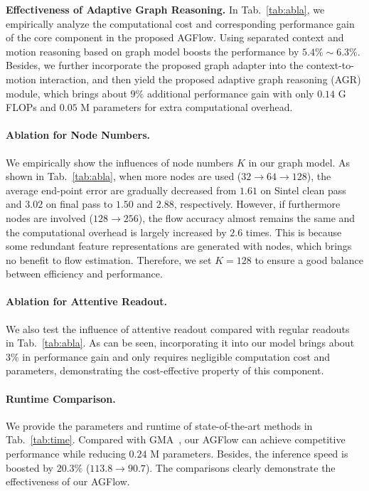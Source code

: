 \documentclass[letterpaper]{article} %
\begin{document}
\textbf{Effectiveness of Adaptive Graph Reasoning.} In Tab.~\ref{tab:abla}, we empirically analyze the computational cost and corresponding performance gain of the core component in the proposed AGFlow. Using separated context and motion reasoning based on graph model boosts the performance by $5.4\% \sim 6.3\%$. Besides, we further incorporate the proposed graph adapter into the context-to-motion interaction, and then yield the proposed adaptive graph reasoning (AGR) module, which brings about $9\%$ additional performance gain with only $0.14$ G FLOPs and $0.05$ M parameters for extra computational overhead.

\paragraph{Ablation for Node Numbers.}
We empirically show the influences of node numbers $K$ in our graph model. As shown in Tab.~\ref{tab:abla}, when more nodes are used ($32 \rightarrow 64 \rightarrow 128$), the average end-point error are gradually decreased from $1.61$ on Sintel clean pass and $3.02$ on final pass to $1.50$ and $2.88$, respectively. However, if furthermore nodes are involved ($128 \rightarrow 256$), the flow accuracy almost remains the same and the computational overhead is largely increased by $2.6$ times. This is because some redundant feature representations are generated with nodes, which brings no benefit to flow estimation. Therefore, we set $K = 128$ to ensure a good balance between efficiency and performance.

\paragraph{Ablation for Attentive Readout.}
We also test the influence of attentive readout compared with regular readouts~\cite{Li2018BeyondGL} in Tab.~\ref{tab:abla}. As can be seen, incorporating it into our model brings about $3\%$ in performance gain and only requires negligible computation cost and parameters, demonstrating the cost-effective property of this component.

\paragraph{Runtime Comparison.}
We provide the parameters and runtime of state-of-the-art methods in Tab.~\ref{tab:time}. Compared with GMA~\cite{Jiang2021LearningTE}, our AGFlow can achieve competitive performance while reducing $0.24$ M parameters. Besides, the inference speed is boosted by $20.3\%$ ($113.8 \rightarrow 90.7$). The comparisons clearly demonstrate the effectiveness of our AGFlow.
\end{document}
